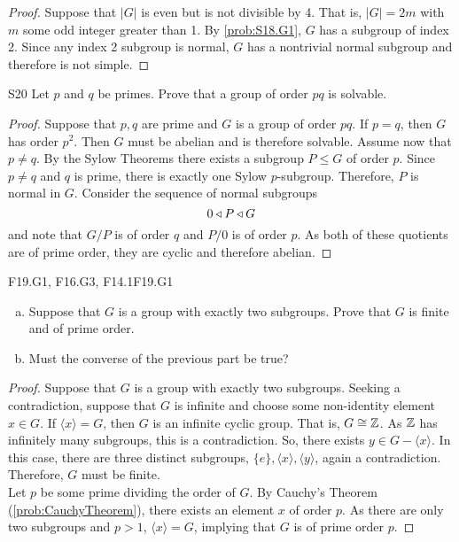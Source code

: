 \documentclass[../../AlgebraQualSolutions.tex]{subfiles}
\begin{document}
	\begin{proof}
	Suppose that $|G|$ is even but is not divisible by 4. That is, $|G| = 2m$ with $m$ some odd integer greater than 1. By \ref{prob:S18.G1}, $G$ has a subgroup of index 2. Since any index 2 subgroup is normal, $G$ has a nontrivial normal subgroup and therefore is not simple.
	\end{proof}
	
	\begin{prob}{S20}{}
	Let $p$ and $q$ be primes. Prove that a group of order $pq$ is solvable.
	\end{prob}
	
	\begin{proof}
	Suppose that $p,q$ are prime and $G$ is a group of order $pq$. If $p = q$, then $G$ has order $p^2$. Then $G$ must be abelian and is therefore solvable. Assume now that $p \neq q$. By the Sylow Theorems there exists a subgroup $P \leq G$ of order $p$. Since $p \neq q$ and $q$ is prime, there is exactly one Sylow $p$-subgroup. Therefore, $P$ is normal in $G$. Consider the sequence of normal subgroups
		\[0 \triangleleft P \triangleleft G \]
	and note that $G/P$ is of order $q$ and $P/0$ is of order $p$. As both of these quotients are of prime order, they are cyclic and therefore abelian. 
	\end{proof}
	
	\begin{prob}{F19.G1, F16.G3, F14.1}{F19.G1}
	\begin{enumerate}[(a)]
	\item Suppose that $G$ is a group with exactly two subgroups. Prove that $G$ is finite and of prime order.
	\item Must the converse of the previous part be true?
	\end{enumerate}
	\end{prob}
	
	\begin{proof}
	Suppose that $G$ is a group with exactly two subgroups. Seeking a contradiction, suppose that $G$ is infinite and choose some non-identity element $x \in G$. If $\langle x \rangle = G$, then $G$ is an infinite cyclic group. That is, $G \cong \mathbb{Z}$. As $\mathbb{Z}$ has infinitely many subgroups, this is a contradiction. So, there exists $y \in G - \langle x \rangle$. In this case, there are three distinct subgroups, $\{e\}, \langle x \rangle, \langle y \rangle$, again a contradiction. Therefore, $G$ must be finite.\\
	
	Let $p$ be some prime dividing the order of $G$. By Cauchy's Theorem (\ref{prob:CauchyTheorem}), there exists an element $x$ of order $p$. As there are only two subgroups and $p > 1$, $\langle x \rangle = G$, implying that $G$ is of prime order $p$.
	\end{proof}
	
\end{document}
